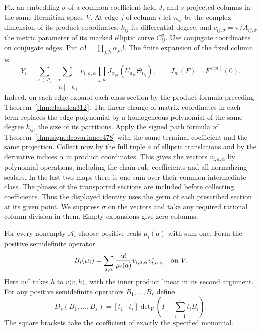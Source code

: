 \documentclass[a4paper,11pt]{article}
\theoremstyle{definition}
\theoremstyle{remark}
\numberwithin{equation}{section}
\begin{document}
Fix an embedding \(\sigma\) of a common coefficient field \(J\),
and \(s\) projected columns in the same Hermitian space \(V\).
At edge \(j\) of column \(i\) let \(n_{ij}\) be the complex dimension
of its product coordinates, \(k_{ij}\) its differential degree,
and \(c_{ij,\sigma}=\pi/A_{ij,\sigma}\) the metric parameter of
its marked elliptic curve \(C_{ij}^\sigma\). Use conjugate coordinates
on conjugate edges. Put \(\alpha!=\prod_{j,h}\alpha_{jh}!\).
The finite expansion of the fixed column is
\[
 Y_i=\sum_{a\in\mathcal A_i}\ \sum_{\substack{\alpha\\
              |\alpha_j|=k_{ij}}}v_{i,a,\alpha}
       \prod_{j,h} J_{\alpha_{jh}}(U_{a_{jh}}\Theta_{t_{ij}}),
       \qquad J_m(F)=F^{(m)}(0).
\]
Indeed, on each edge expand each class section by the product formula
preceding Theorem~\ref{thm:classden312}. The linear change of matrix
coordinates in each term replaces the edge polynomial by a homogeneous
polynomial of the same degree \(k_{ij}\), the size of its partitions.
Apply the signed path formula of Theorem~\ref{thm:signedcovariance478}
with the same terminal coefficient and the same projection. Collect now
by the full tuple \(a\) of elliptic translations and by the derivative
indices \(\alpha\) in product coordinates. This gives the vectors
\(v_{i,a,\alpha}\) by polynomial operations, including the chain-rule
coefficients and all normalizing scalars. In the last two maps there is
one sum over their common intermediate class. The phases of the transported
sections are included before collecting coefficients. Thus the displayed
identity uses the germ of each prescribed section at its given point.
We suppress \(\sigma\) on the vectors and take any required rational
column division in them. Empty expansions give zero columns.

For every nonempty \(\mathcal A_i\) choose positive reals
\(\mu_i(a)\) with sum one. Form the positive semidefinite operator
\[
 B_i(\mu_i)=\sum_{a,\alpha}{\alpha!\over \mu_i(a)}
                    v_{i,a,\alpha}v_{i,a,\alpha}^*
 \quad\text{on }V .
\]
Here \(vv^*\) takes \(h\) to \(v\langle v,h\rangle\), with the inner
product linear in its second argument. For any positive semidefinite
operators \(B_1,\ldots,B_s\) define
\[
 D_s(B_1,\ldots,B_s)
     =[t_1\cdots t_s]\det\nolimits_V
                         \left(I+\sum_{i=1}^s t_iB_i\right).
\]
The square brackets take the coefficient of exactly the specified
monomial.
\end{document}
